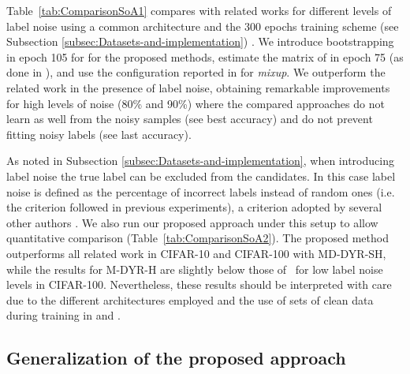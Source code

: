 \documentclass{article}
\begin{document}
Table~\ref{tab:ComparisonSoA1} compares with related works for different levels of label noise using a common architecture and the 300 epochs training scheme (see
Subsection \ref{subsec:Datasets-and-implementation}) .
We introduce bootstrapping in epoch 105 for \cite{2015_ICLR_Bootstrapping}
for the proposed methods, estimate the  matrix of \cite{2017_CVPR_ForwardLoss}
in epoch 75 (as done in \cite{2018_NIPS_GoldLoss}), and use the configuration reported in \cite{2018_ICLR_mixup} for \emph{mixup}. We outperform the
related work in the presence of label noise, obtaining remarkable improvements
for high levels of noise (80\% and 90\%) where the compared
approaches do not learn as well from the noisy samples (see best accuracy)
and do not prevent fitting noisy labels (see last accuracy).

As noted in Subsection \ref{subsec:Datasets-and-implementation},
when introducing label noise the true label can be excluded from the
candidates. In this case label noise is defined as the percentage of incorrect labels
instead of random ones (i.e. the criterion followed in previous experiments), a criterion adopted by several other authors \cite{2018_ICML_MentorNet,2018_ICML_DimDriven,2018_ICML_L2ReweightNoise,2018_CVPR_IterativeNoise}. We also run our proposed approach under this setup to allow  quantitative comparison (Table~\ref{tab:ComparisonSoA2}). The proposed method outperforms all related work in CIFAR-10 and CIFAR-100 with MD-DYR-SH,
while the results for M-DYR-H are slightly below those of~\cite{2018_ICML_MentorNet}
for low label noise levels in CIFAR-100. Nevertheless, these results should be interpreted with care due to the different architectures employed and
the use of sets of clean data during training in \cite{2018_ICML_MentorNet}
and \cite{2018_ICML_L2ReweightNoise}.

\subsection{Generalization of the proposed approach\label{subsec:Additional datasets}}
\end{document}
